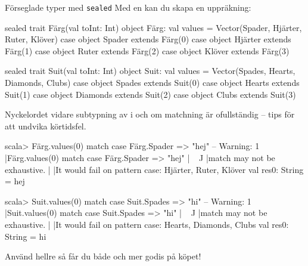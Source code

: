 \begin{Slide}{Förseglade typer med \texttt{sealed}}\SlideFontTiny
Med en  kan du skapa en  uppräkning:
\ifswedish
\begin{Code}
sealed trait Färg(val toInt: Int)
object Färg:
  val values = Vector(Spader, Hjärter, Ruter, Klöver)
  case object Spader  extends Färg(0)
  case object Hjärter extends Färg(1)
  case object Ruter   extends Färg(2)
  case object Klöver  extends Färg(3)
\end{Code}
\else
\begin{Code}
sealed trait Suit(val toInt: Int)
object Suit:
  val values = Vector(Spades, Hearts, Diamonds, Clubs)
  case object Spades  extends Suit(0)
  case object Hearts extends Suit(1)
  case object Diamonds   extends Suit(2)
  case object Clubs  extends Suit(3)
\end{Code}
\fi{}
Nyckelordet   vidare subtypning av \ifswedish{}\else{}\fi{} i  och  om matchning är ofullständig -- tips för att undvika körtidsfel.

\ifswedish
\begin{REPLsmall}
scala> Färg.values(0) match { case Färg.Spader => "hej" }
-- Warning:
1 |Färg.values(0) match { case Färg.Spader => "hej" }
  |^^^^^^^^^^^^^^
  |match may not be exhaustive.
  |
  |It would fail on pattern case: Hjärter, Ruter, Klöver
val res0: String = hej
\end{REPLsmall}
\else
\begin{REPLsmall}
scala> Suit.values(0) match { case Suit.Spades => "hi" }
-- Warning:
1 |Suit.values(0) match { case Suit.Spades => "hi" }
  |^^^^^^^^^^^^^^
  |match may not be exhaustive.
  |
  |It would fail on pattern case: Hearts, Diamonds, Clubs
val res0: String = hi
\end{REPLsmall}
\fi{}
Använd hellre  så får du både  och mer godis på köpet!
\end{Slide}
  
        
  

